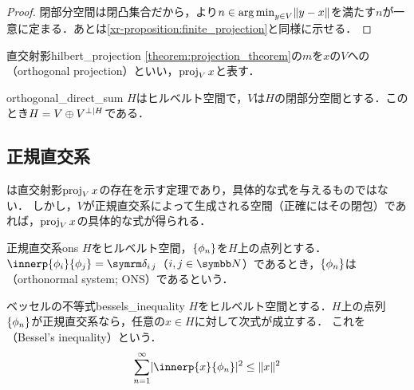 \documentclass[../../main]{subfiles}
\begin{document}
\begin{proof}
  閉部分空間は閉凸集合だから，より\(n\in\operatorname*{arg\,min}_{y\in V}\lVert y-x\rVert\)を満たす\(n\)が一意に定まる．あとは\cref{xr-proposition:finite_projection}と同様に示せる．
\end{proof}

\begin{definition}{直交射影}{hilbert_projection}
  \cref{theorem:projection_theorem}の\(m\)を\(x\)の\(V\)への（orthogonal projection）といい，\(\operatorname{proj}_Vx\)と表す．
\end{definition}

\begin{proposition}{}{orthogonal_direct_sum}
  \(H\)はヒルベルト空間で，\(V\)は\(H\)の閉部分空間とする．このとき\(H=V\oplus\pcomp[H]{V}\)である．
\end{proposition}

\subsection{正規直交系}

は直交射影\(\operatorname{proj}_Vx\)の存在を示す定理であり，具体的な式を与えるものではない．
しかし，\(V\)が正規直交系によって生成される空間（正確にはその閉包）であれば，\(\operatorname{proj}_Vx\)の具体的な式が得られる．

\begin{definition}{正規直交系}{ons}
  \(H\)をヒルベルト空間，\(\lbrace\phi_n\rbrace\)を\(H\)上の点列とする．\(\innerp{\phi_i}{\phi_j}=\kdelta{i}{j}\)（\(i,j\in\numset{N}\)）であるとき，\(\lbrace\phi_n\rbrace\)は（orthonormal system; ONS）であるという．
\end{definition}

\begin{theorem}{ベッセルの不等式}{bessels_inequality}
  \(H\)をヒルベルト空間とする．\(H\)上の点列\(\lbrace\phi_n\rbrace\)が正規直交系なら，任意の\(x\in H\)に対して次式が成立する．
  これを（Bessel's inequality）という．
  \begin{equation}
    \label{equation:bessels_inequality}
    \sum_{n=1}^\infty\abs{\innerp{x}{\phi_n}}^2 \leq \vnorm{x}^2
  \end{equation}
\end{theorem}
\end{document}
